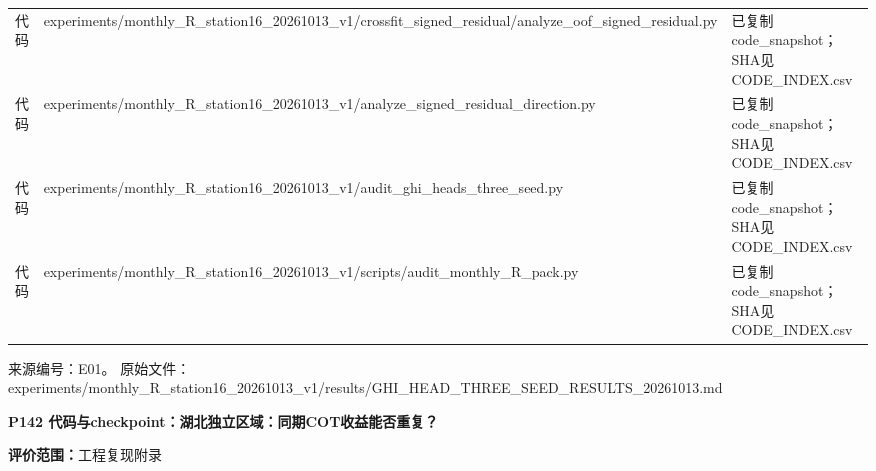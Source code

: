 \documentclass[UTF8,a4paper,landscape,10pt]{ctexart}
\begin{document}
\begin{center}
\begin{adjustbox}{max totalheight=0.58\textheight,max width=\linewidth}
\begin{minipage}{\linewidth}
\begin{tabularx}{\linewidth}{>{\hsize=0.3500\hsize\raggedright\arraybackslash}X>{\hsize=1.9000\hsize\raggedright\arraybackslash}X>{\hsize=0.7500\hsize\raggedright\arraybackslash}X}
代码 & experiments/\allowbreak{}monthly\_\allowbreak{}R\_\allowbreak{}station16\_\allowbreak{}20261013\_\allowbreak{}v1/\allowbreak{}crossfit\_\allowbreak{}signed\_\allowbreak{}residual/\allowbreak{}analyze\_\allowbreak{}oof\_\allowbreak{}signed\_\allowbreak{}residual.py & 已复制code\_\allowbreak{}snapshot；SHA见CODE\_\allowbreak{}INDEX.csv \\
代码 & experiments/\allowbreak{}monthly\_\allowbreak{}R\_\allowbreak{}station16\_\allowbreak{}20261013\_\allowbreak{}v1/\allowbreak{}analyze\_\allowbreak{}signed\_\allowbreak{}residual\_\allowbreak{}direction.py & 已复制code\_\allowbreak{}snapshot；SHA见CODE\_\allowbreak{}INDEX.csv \\
代码 & experiments/\allowbreak{}monthly\_\allowbreak{}R\_\allowbreak{}station16\_\allowbreak{}20261013\_\allowbreak{}v1/\allowbreak{}audit\_\allowbreak{}ghi\_\allowbreak{}heads\_\allowbreak{}three\_\allowbreak{}seed.py & 已复制code\_\allowbreak{}snapshot；SHA见CODE\_\allowbreak{}INDEX.csv \\
代码 & experiments/\allowbreak{}monthly\_\allowbreak{}R\_\allowbreak{}station16\_\allowbreak{}20261013\_\allowbreak{}v1/\allowbreak{}scripts/\allowbreak{}audit\_\allowbreak{}monthly\_\allowbreak{}R\_\allowbreak{}pack.py & 已复制code\_\allowbreak{}snapshot；SHA见CODE\_\allowbreak{}INDEX.csv \\
\bottomrule\end{tabularx}\end{minipage}\end{adjustbox}\end{center}
\vfill{\scriptsize\color{muted} 来源编号：E01。 原始文件：experiments/\allowbreak{}monthly\_\allowbreak{}R\_\allowbreak{}station16\_\allowbreak{}20261013\_\allowbreak{}v1/\allowbreak{}results/\allowbreak{}GHI\_\allowbreak{}HEAD\_\allowbreak{}THREE\_\allowbreak{}SEED\_\allowbreak{}RESULTS\_\allowbreak{}20261013.md}\par
\clearpage
{\large\bfseries\color{ink} P142  代码与checkpoint：湖北独立区域：同期COT收益能否重复？}\par
{}\par
{\small\color{muted}\textbf{评价范围：}工程复现附录}\par\vspace{3mm}
\end{document}
